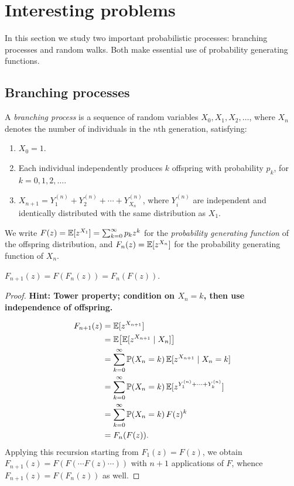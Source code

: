 \documentclass[a4paper]{article}
\begin{document}
\section{Interesting problems}
\begin{remark}
  In this section we study two important probabilistic processes: branching processes and random walks.
  Both make essential use of probability generating functions.
\end{remark}

\subsection{Branching processes}
\begin{defi}
  A \emph{branching process} is a sequence of random variables $X_0, X_1, X_2, \dotsc$, where $X_n$ denotes the number of individuals in the $n$th generation, satisfying:
  \begin{enumerate}
    \item $X_0 = 1$.
    \item Each individual independently produces $k$ offspring with probability $p_k$, for $k = 0, 1, 2, \dotsc$.
    \item $X_{n+1} = Y_1^{(n)} + Y_2^{(n)} + \cdots + Y_{X_n}^{(n)}$, where $Y_i^{(n)}$ are independent and identically distributed with the same distribution as $X_1$.
  \end{enumerate}
  We write $F(z) = \mathbb{E}[z^{X_1}] = \sum_{k=0}^\infty p_k z^k$ for the \emph{probability generating function} of the offspring distribution, and $F_n(z) = \mathbb{E}[z^{X_n}]$ for the probability generating function of $X_n$.
\end{defi}

\begin{thm}
  $F_{n+1}(z) = F(F_n(z)) = F_n(F(z))$.
\end{thm}

\begin{proof}
  \textbf{Hint: Tower property; condition on $X_n = k$, then use independence of offspring.}

  \begin{align*}
    F_{n+1}(z)
    &= \mathbb{E}[z^{X_{n+1}}]\\
    &= \mathbb{E}\bigl[\mathbb{E}[z^{X_{n+1}} \mid X_n]\bigr]\\
    &= \sum_{k=0}^\infty \mathbb{P}(X_n = k)\,\mathbb{E}[z^{X_{n+1}} \mid X_n = k]\\
    &= \sum_{k=0}^\infty \mathbb{P}(X_n = k)\,\mathbb{E}[z^{Y_1^{(n)} + \cdots + Y_k^{(n)}}]\\
    &= \sum_{k=0}^\infty \mathbb{P}(X_n = k)\, F(z)^k\\
    &= F_n(F(z)).
  \end{align*}
  Applying this recursion starting from $F_1(z) = F(z)$, we obtain $F_{n+1}(z) = F(F(\cdots F(z) \cdots))$ with $n+1$ applications of $F$, whence $F_{n+1}(z) = F(F_n(z))$ as well.
\end{proof}
\end{document}
